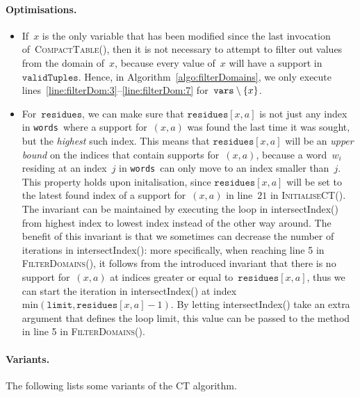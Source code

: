 \documentclass[a4paper,11pt]{article}
\newcommand{\Algoref}[1]{Algorithm~\ref{#1}}
\newcommand{\linesref}[2]{lines~\ref{#1}--\ref{#2}}
\newcommand{\Words}{\texttt{words}}
\newcommand{\Limit}{\texttt{limit}}
\newcommand{\CurrTable}{\texttt{validTuples}}
\newcommand{\Residues}{\texttt{residues}}
\newcommand{\Vars}{\texttt{vars}}
\def\CompactTable{\textsc{CompactTable}}
\def\FilterDomains{\textsc{FilterDomains}}
\def\InitialiseCT{\textsc{InitialiseCT}}
\numberwithin{equation}{section}
\begin{document}
\paragraph{Optimisations.}
\begin{itemize}
  \item If~$x$ is the only variable
    that has been modified since the last invocation of~\CompactTable(),
    then it is not necessary to attempt to filter out values from 
    the domain of~$x$, because every value of~$x$ will have a
    support in~$\CurrTable$.
    Hence, in \Algoref{algo:filterDomains}, we only execute
    \linesref{line:filterDom:3}{line:filterDom:7} for~$\Vars \setminus \Set{x}$.

  \item For~$\Residues$, we can make sure that $\Residues[x,a]$ is not just
    any index in \Words~where a support for~$(x,a)$ was found the last time
    it was sought, but the \emph{highest} such index.
    This means that $\Residues[x,a]$
    will be an \emph{upper bound} on the indices that contain supports
    for~$(x,a)$, because a word~$w_i$ residing at an index~$j$ in 
    \Words~can only move to an index smaller than~$j$.
    This property holds upon initalisation, since
    $\Residues[x,a]$ will be set to the latest found index of a support for~$(x,a)$
    in line~$21$ in \InitialiseCT(). The invariant can be maintained by 
    executing the loop in intersectIndex() from highest index to lowest
    index instead of the other way around. 
    The benefit of this invariant is that we sometimes can decrease the 
    number of iterations in intersectIndex():
    more specifically, when reaching line 5 in \FilterDomains(), it follows
    from the introduced invariant that there is no support 
    for~$(x,a)$ at indices greater or equal to~$\Residues[x,a]$,
    thus we can start the iteration in intersectIndex()
    at index~$\text{min}(\Limit,\Residues[x,a]-1)$.
    By letting intersectIndex() take an extra argument that defines the loop
    limit, this value can be passed to the method in line 5 in \FilterDomains().
    
\end{itemize} 

\paragraph{Variants.}
The following lists some variants of the CT algorithm.
\newline 
\end{document}
